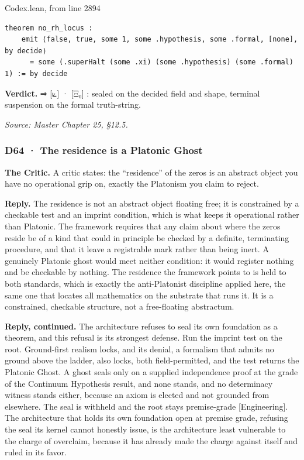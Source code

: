 \documentclass[10pt,twocolumn]{article}
\begin{document}
\begin{leanexcerpt}{Codex.lean, from line 2894}
\begin{lstlisting}[style=leanx,firstnumber=2894]
theorem no_rh_locus :
    emit ⟨false, true, some 1, some .hypothesis, some .formal, [none], by decide⟩
      = some (.superHalt (some .xi) (some .hypothesis) (some .formal) 1) := by decide
\end{lstlisting}
\end{leanexcerpt}

\textbf{Verdict.} ⇒ {[}⟀{]} · {[}Ξ₀{]} : sealed on the decided field and
shape, terminal suspension on the formal truth-string.

\emph{Source: Master Chapter 25, §12.5.}

\hypertarget{d64-the-residence-is-a-platonic-ghost}{%
\subsubsection{D64 · The residence is a Platonic
Ghost}\label{d64-the-residence-is-a-platonic-ghost}}

\textbf{The Critic.} A critic states: the ``residence'' of the zeros is
an abstract object you have no operational grip on, exactly the
Platonism you claim to reject.

\textbf{Reply.} The residence is not an abstract object floating free;
it is constrained by a checkable test and an imprint condition, which is
what keeps it operational rather than Platonic. The framework requires
that any claim about where the zeros reside be of a kind that could in
principle be checked by a definite, terminating procedure, and that it
leave a registrable mark rather than being inert. A genuinely Platonic
ghost would meet neither condition: it would register nothing and be
checkable by nothing. The residence the framework points to is held to
both standards, which is exactly the anti-Platonist discipline applied
here, the same one that locates all mathematics on the substrate that
runs it. It is a constrained, checkable structure, not a free-floating
abstractum.

\textbf{Reply, continued.} The architecture refuses to seal its own
foundation as a theorem, and this refusal is its strongest defense. Run
the imprint test on the root. Ground-first realism locks, and its
denial, a formalism that admits no ground above the ladder, also locks,
both field-permitted, and the test returns the Platonic Ghost. A ghost
seals only on a supplied independence proof at the grade of the
Continuum Hypothesis result, and none stands, and no determinacy witness
stands either, because an axiom is elected and not grounded from
elsewhere. The seal is withheld and the root stays premise-grade
{[}Engineering{]}. The architecture that holds its own foundation open
at premise grade, refusing the seal its kernel cannot honestly issue, is
the architecture least vulnerable to the charge of overclaim, because it
has already made the charge against itself and ruled in its favor.
\end{document}
